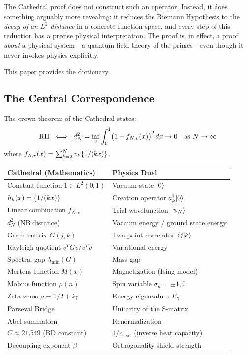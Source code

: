\documentclass[11pt,a4paper]{article}
\begin{document}
The Cathedral proof does not construct such an operator. Instead, it does
something arguably more revealing: it reduces the Riemann Hypothesis to
the \emph{decay of an $L^2$ distance} in a concrete function space, and
every step of this reduction has a precise physical interpretation. The proof
is, in effect, a proof \emph{about} a physical system---a quantum field
theory of the primes---even though it never invokes physics explicitly.

This paper provides the dictionary.

\subsection{The Central Correspondence}

The crown theorem of the Cathedral states:
\[
  \mathrm{RH} \;\iff\;
  d_N^2 = \inf_v \int_0^1 \bigl(1 - f_{N,v}(x)\bigr)^2\,dx \to 0
  \quad\text{as } N \to \infty
\]
where $f_{N,v}(x) = \sum_{k=2}^N v_k \{1/(kx)\}$.

\begin{correspondence}
\label{corr:master}
\begin{center}
\begin{tabular}{@{}ll@{}}
\toprule
\textbf{Cathedral (Mathematics)} & \textbf{Physics Dual} \\
\midrule
Constant function $1 \in L^2(0,1)$ & Vacuum state $| 0 \rangle$ \\
$h_k(x) = \{1/(kx)\}$ & Creation operator $a_k^\dagger | 0 \rangle$ \\
Linear combination $f_{N,v}$ & Trial wavefunction $| \psi_N \rangle$ \\
$d_N^2$ (NB distance) & Vacuum energy / ground state energy \\
Gram matrix $G(j,k)$ & Two-point correlator $\langle j | k \rangle$ \\
Rayleigh quotient $v^T G v / v^T v$ & Variational energy \\
Spectral gap $\lambda_{\min}(G)$ & Mass gap \\
Mertens function $M(x)$ & Magnetization (Ising model) \\
M\"obius function $\mu(n)$ & Spin variable $\sigma_n = \pm 1, 0$ \\
Zeta zeros $\rho = 1/2 + i\gamma$ & Energy eigenvalues $E_\gamma$ \\
Parseval Bridge & Unitarity of the S-matrix \\
Abel summation & Renormalization \\
$C \approx 21.649$ (BD constant) & $1/c_{\text{heat}}$ (inverse heat capacity) \\
Decoupling exponent $\beta$ & Orthogonality shield strength \\
\bottomrule
\end{tabular}
\end{center}
\end{correspondence}
\end{document}
